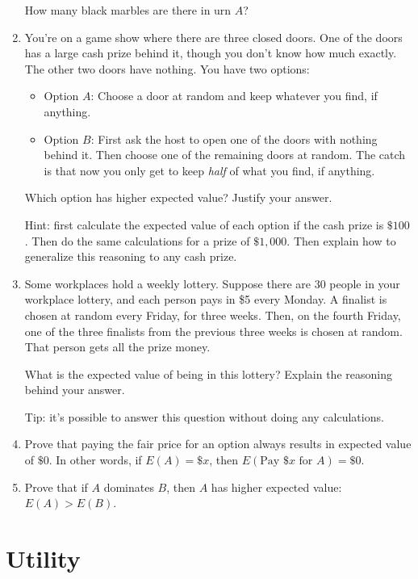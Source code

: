 \documentclass[justified]{tufte-book}
\providecommand{\tightlist}{%
  \setlength{\itemsep}{0pt}\setlength{\parskip}{0pt}}
\theoremstyle{definition}
\theoremstyle{definition}
\theoremstyle{definition}
\theoremstyle{remark}
\begin{document}
\begin{enumerate}
  How many black marbles are there in urn \(A\)?
\item
  You're on a game show where there are three closed doors. One of the
  doors has a large cash prize behind it, though you don't know how much
  exactly. The other two doors have nothing. You have two options:

  \begin{itemize}
  \tightlist
  \item
    Option \(A\): Choose a door at random and keep whatever you find, if
    anything.
  \item
    Option \(B\): First ask the host to open one of the doors with
    nothing behind it. Then choose one of the remaining doors at random.
    The catch is that now you only get to keep \emph{half} of what you
    find, if anything.
  \end{itemize}

  Which option has higher expected value? Justify your answer.

  Hint: first calculate the expected value of each option if the cash
  prize is \(\$100\). Then do the same calculations for a prize of
  \(\$1,000\). Then explain how to generalize this reasoning to any cash
  prize.
\item
  Some workplaces hold a weekly lottery. Suppose there are 30 people in
  your workplace lottery, and each person pays in \$5 every Monday. A
  finalist is chosen at random every Friday, for three weeks. Then, on
  the fourth Friday, one of the three finalists from the previous three
  weeks is chosen at random. That person gets all the prize money.

  What is the expected value of being in this lottery? Explain the
  reasoning behind your answer.

  Tip: it's possible to answer this question without doing any
  calculations.
\item
  Prove that paying the fair price for an option always results in
  expected value of \(\$0\). In other words, if \(E(A) = \$x\), then
  \(E(\mbox{Pay } \$x \mbox{ for } A) = \$0\).
\item
  Prove that if \(A\) dominates \(B\), then \(A\) has higher expected
  value: \(E(A) > E(B)\).
\end{enumerate}

\hypertarget{utility}{%
\chapter{Utility}\label{utility}}
\end{document}
